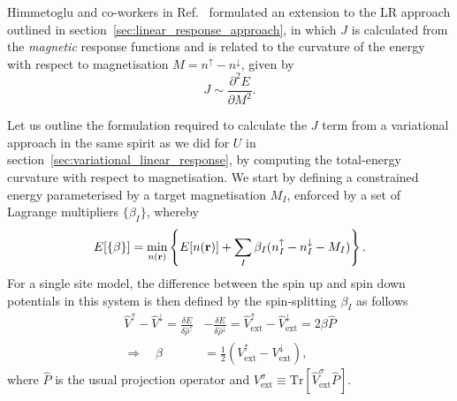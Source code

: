 Himmetoglu and co-workers 
in Ref.~\cite{PhysRevB.84.115108} 
formulated an extension to the LR approach outlined in section~\ref{sec:linear_response_approach}, 
in which $J$ is calculated from 
the {\it magnetic} response functions 
and is related to the curvature of the energy 
with respect to magnetisation 
$M=n^\uparrow-n^\downarrow$, given by
%
\begin{equation}
J \sim \frac{\partial^2E}{\partial M^2}.
\label{eq:j_curvature}
\end{equation}
%

Let us outline the formulation required 
to calculate the $J$ term from a variational approach
in the same spirit as we did for $U$ 
in section~\ref{sec:variational_linear_response}, 
by computing the total-energy curvature 
with respect to magnetisation.
%
We start by defining a constrained energy 
parameterised by a target magnetisation $M_I$, 
enforced by a set of Lagrange multipliers $\{\beta_I\}$, 
whereby 
%
\begin{equation}
E[\{\beta\}]=\min_{n({{\bf r}})}\left\{E[n({{\bf r}})]
+\sum_I \beta_I(n_I^\uparrow-n_I^\downarrow-M_I)\right\}.
\label{eq:coc_linear_response4}
\end{equation}
%
For a single site model, 
the difference between the 
spin up and spin down potentials 
in this system is then defined by the spin-splitting $\beta_I$ 
as follows
%
\begin{align}
\hat{V}^\uparrow-\hat{V}^\downarrow
=\frac{\delta E}{\delta \hat{\rho}^\uparrow}&-\frac{\delta E}{\delta \hat{\rho}^\downarrow}
= \hat{V}_\textrm{ext}^\uparrow-\hat{V}_\textrm{ext}^\downarrow 
= 2\beta\hat{P}\nonumber \\[0.5em]
\Rightarrow\quad 
\beta&=\frac{1}{2}\left( {V}_\textrm{ext}^\uparrow-{V}_\textrm{ext}^\downarrow\right), 
\end{align}
%
where $\hat{P}$ is the usual projection operator and 
$V_\textrm{ext}^\sigma\equiv \textrm{Tr}\left[\hat{V}_\textrm{ext}^\sigma\hat{P}\right]$.

